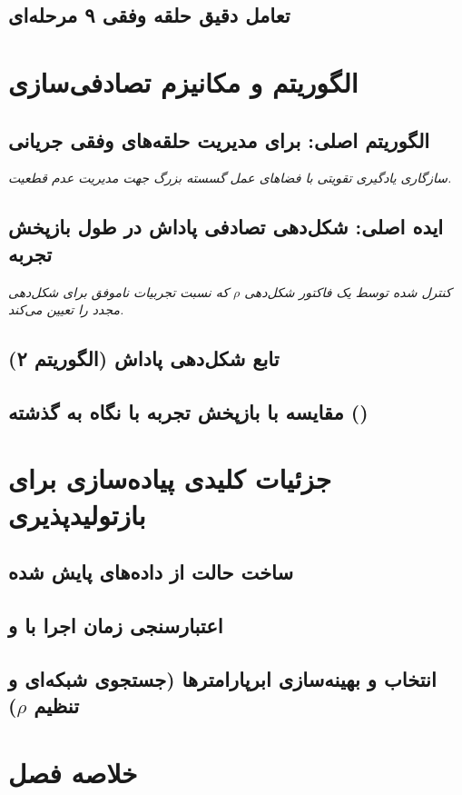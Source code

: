 \documentclass[oneside,openany,phd]{TMU-Thesis}
\begin{document}
\subsection{تعامل دقیق حلقه وفقی ۹ مرحله‌ای}

\section{الگوریتم  و مکانیزم تصادفی‌سازی}
\subsection{الگوریتم اصلی:  برای مدیریت حلقه‌های وفقی جریانی}
\textit{سازگاری یادگیری تقویتی با فضاهای عمل گسسته بزرگ جهت مدیریت عدم قطعیت.}
\subsection{ایده اصلی: شکل‌دهی تصادفی پاداش در طول بازپخش تجربه}
\textit{کنترل شده توسط یک فاکتور شکل‌دهی \texorpdfstring{$\rho$}{rho} که نسبت تجربیات ناموفق برای شکل‌دهی مجدد را تعیین می‌کند.}
\subsection{تابع شکل‌دهی پاداش (الگوریتم ۲)}
\subsection{مقایسه با بازپخش تجربه با نگاه به گذشته ()}

\section{جزئیات کلیدی پیاده‌سازی برای بازتولیدپذیری}
\subsection{ساخت حالت از داده‌های پایش شده}
\subsection{اعتبارسنجی زمان اجرا با  و }
\subsection{انتخاب و بهینه‌سازی ابرپارامترها (جستجوی شبکه‌ای و تنظیم \texorpdfstring{$\rho$}{rho})}

\section{خلاصه فصل}
\end{document}
